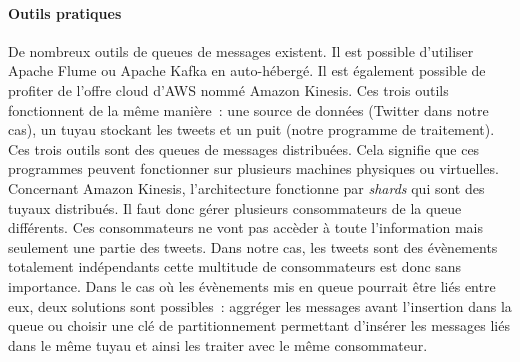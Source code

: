   \paragraph{Outils pratiques}
  \label{par:Outils pratiques}
  De nombreux outils de queues de messages existent. Il est possible d'utiliser Apache Flume ou Apache Kafka en auto-hébergé. Il est également possible de profiter de l'offre cloud d'AWS nommé Amazon Kinesis. Ces trois outils fonctionnent de la même manière : une source de données (Twitter dans notre cas), un tuyau stockant les tweets et un puit (notre programme de traitement).\\

  Ces trois outils sont des queues de messages distribuées. Cela signifie que ces programmes peuvent fonctionner sur plusieurs machines physiques ou virtuelles. Concernant Amazon Kinesis, l'architecture fonctionne par \textit{shards} qui sont des tuyaux distribués. Il faut donc gérer plusieurs consommateurs de la queue différents. Ces consommateurs ne vont pas accèder à toute l'information mais seulement une partie des tweets. Dans notre cas, les tweets sont des évènements totalement indépendants cette multitude de consommateurs est donc sans importance. Dans le cas où les évènements mis en queue pourrait être liés entre eux, deux solutions sont possibles : aggréger les messages avant l'insertion dans la queue ou choisir une clé de partitionnement permettant d'insérer les messages liés dans le même tuyau et ainsi les traiter avec le même consommateur. 
